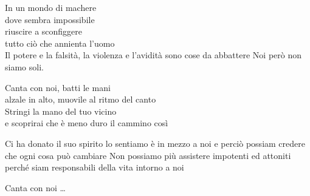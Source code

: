 
\beginverse

In un mondo di machere \\
dove sembra impossibile \\
riuscire a sconfiggere \\
tutto ciò che annienta l'uomo \\

\chordsoff
Il potere e la falsità,
la violenza e l'avidità 
sono cose da abbattere
Noi però non siamo soli.

\endverse

\chordson

\beginchorus

Canta con noi, 
batti le mani \\ 
alzale in alto, 
muovile al ritmo del canto \\
Stringi la mano del tuo vicino \\
e scoprirai che è meno duro il cammino così 

\endchorus

\chordsoff

\beginverse

Ci ha donato il suo spirito
lo sentiamo è in mezzo a noi
e perciò possiam credere 
che ogni cosa può cambiare
Non possiamo più assistere 
impotenti ed attoniti
perché siam responsabili 
della vita intorno a noi

\endverse

\beginchorus

Canta con noi \dots

\endchorus

\endsong